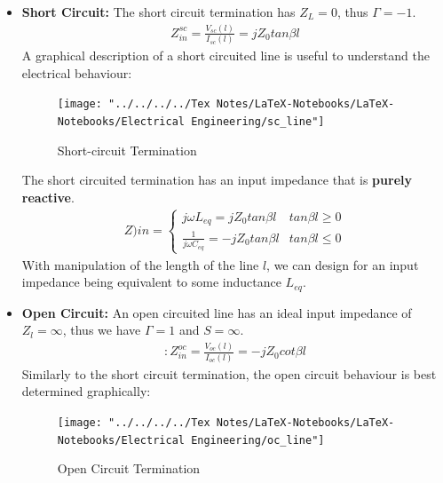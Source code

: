 \documentclass{book}
\begin{document}
\begin{itemize}
	\item \textbf{Short Circuit:}  The short circuit termination has $Z_L=0$, thus $\Gamma = -1$.   
	\begin{align*}
		Z_{in}^{sc} = \frac{V_{sc}(l)}{I_{sc}(l)} = j Z_0 tan \beta l
	\end{align*}
	A graphical description of a short circuited line is useful to understand the electrical behaviour:
	\begin{figure}[h]
		\centering
		\texttt{[image: "../../../../Tex Notes/LaTeX-Notebooks/LaTeX-Notebooks/Electrical Engineering/sc\_line"]}
		\caption{Short-circuit Termination}
		\label{fig:scline}
	\end{figure}
	The short circuited termination has an input impedance that is \textbf{purely reactive}.
	\begin{align*}
		Z){in} =\begin{cases}
					 j \omega L_{eq} = j Z_0 tan \beta l & tan\beta l \geq 0 \\
					\frac{1}{j \omega C_{eq}} = -j Z_0 tan \beta l & tan \beta l \leq 0
				\end{cases}
	\end{align*}
	With manipulation of the length of the line $l$, we can design for an input impedance being equivalent to some inductance $L_{eq}$.
	\item \textbf{Open Circuit:} An open circuited line has an ideal input impedance of $Z_l = \infty$, thus we have $\Gamma = 1$ and $S= \infty$.
	\begin{align*}:
		Z_{in}^{oc} = \frac{V_{oc}(l)}{I_{oc}(l)}= -j Z_0 cot \beta l
	\end{align*}
	Similarly to the short circuit termination, the open circuit behaviour is best determined graphically:
	\begin{figure}[h]
		\centering
		\texttt{[image: "../../../../Tex Notes/LaTeX-Notebooks/LaTeX-Notebooks/Electrical Engineering/oc\_line"]}
		\caption{Open Circuit Termination}
		\label{fig:ocline}
	\end{figure}
\end{itemize}
\end{document}
